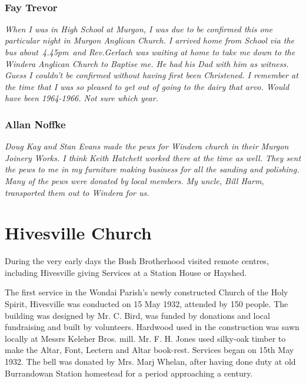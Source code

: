 ~



\subsubsection{Fay Trevor}



\emph{When I was in High School at Murgon, I was due to be confirmed this one particular night in Murgon Anglican Church. I arrived home from School via the bus about~4.45pm~and Rev.Gerlach was waiting at home to take me down to the Windera Anglican Church to Baptise me. He had his Dad with him as witness. Guess I couldn't be confirmed without having first been Christened. I remember at the time that I was so pleased to get out of going to the dairy that arvo. Would have been 1964-1966. Not sure which year.}



\subsubsection{Allan Noffke}



\emph{Doug Kay and Stan Evans made the pews for Windera church in their Murgon Joinery Works. I think Keith Hatchett worked there at the time as well. They sent the pews to me in my furniture making business for all the sanding and polishing. Many of the pews were donated by local members. My uncle, Bill Harm, transported them out to Windera for us.}



\section{Hivesville Church}



During the very early days the Bush Brotherhood visited remote centres, including Hivesville giving Services at a Station House or Hayshed.



The first service in the Wondai Parish's newly constructed Church of the Holy Spirit, Hivesville was conducted on 15 May 1932, attended by 150 people. The building was designed by Mr. C. Bird, was funded by donations and local fundraising and built by volunteers. Hardwood used in the construction was sawn locally at Messrs Keleher Bros. mill. Mr. F. H. Jones used silky-oak timber to make the Altar, Font, Lectern and Altar book-rest. Services began on 15th May 1932. The bell was donated by Mrs. Marj Whelan, after having done duty at old Burrandowan Station homestead for a period approaching a century.



